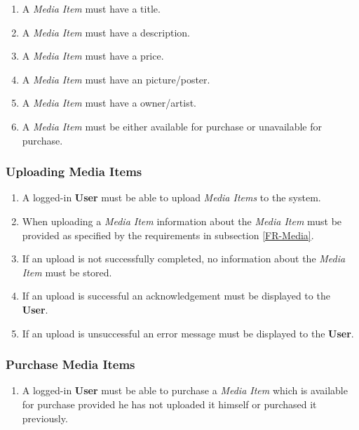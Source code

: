 \begin{enumerate}[label=FR-\twodigits*, resume]
	\item A \textit{Media Item} must have a title.
	\item A \textit{Media Item} must have a description.
	\item A \textit{Media Item} must have a price.
	\item A \textit{Media Item} must have an picture/poster.
	\item A \textit{Media Item} must have a owner/artist.
	\item A \textit{Media Item} must be either available for purchase or unavailable for purchase.
\end{enumerate}

\subsubsection {Uploading Media Items}

\begin{enumerate}[label=FR-\twodigits*, resume]
	\item A logged-in \textbf{User} must be able to upload \textit{Media Items} to the system.
	\item When uploading a \textit{Media Item} information about the \textit{Media Item} must be provided as specified by the requirements in subsection \ref{FR-Media}.
	\item If an upload is not successfully completed, no information about the \textit{Media Item} must be stored.
	\item If an upload is successful an acknowledgement must be displayed to the \textbf{User}.
	\item If an upload is unsuccessful an error message must be displayed to the \textbf{User}. 
\end{enumerate}

\subsubsection {Purchase Media Items}

\begin{enumerate}[label=FR-\twodigits*, resume]
	\item A logged-in \textbf{User} must be able to purchase a \textit{Media Item} which is available for purchase provided he has not uploaded it himself or  purchased it previously.
\end{enumerate}

